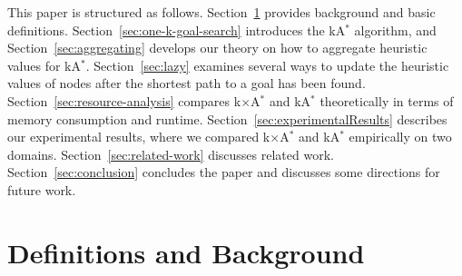 \documentclass[smallextended]{svjour3}       %
\newcommand{\kastar}{kA$^*$\xspace}
\newcommand{\kxastar}{k$\times$A$^*$\xspace}
\begin{document}
This paper is structured as follows. Section~\ref{sec:defAndBackground} provides background and basic definitions. 
Section~\ref{sec:one-k-goal-search} introduces the \kastar algorithm, 
and Section~\ref{sec:aggregating} develops our theory on how to aggregate heuristic values for \kastar. Section~\ref{sec:lazy} examines several ways to update the heuristic values of nodes after the shortest path to a goal has been found. Section~\ref{sec:resource-analysis} compares \kxastar and \kastar theoretically in terms of memory consumption and runtime. 
Section~\ref{sec:experimentalResults} describes our experimental results, where we compared \kxastar and \kastar empirically on two domains. 
Section~\ref{sec:related-work} discusses related work. 
Section~\ref{sec:conclusion} concludes the paper and discusses some directions for future work. 


\section{Definitions and Background}
\label{sec:defAndBackground}
\end{document}
